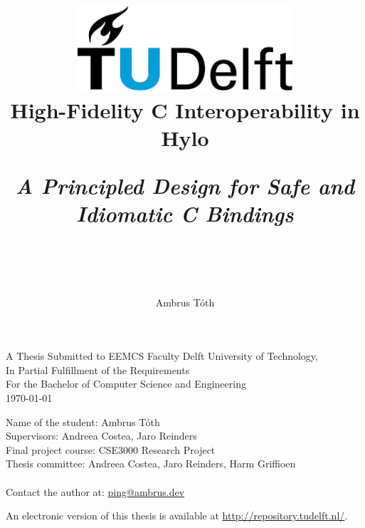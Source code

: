 \title{
    \includegraphics[width=8cm, keepaspectratio]{tudelftlogo.png}\\
    \vspace*{2cm}
    \textbf{
        {High-Fidelity C Interoperability in Hylo}
    }\\
    \vspace*{0.5cm}
    
    \parbox{0.9\linewidth}{
        \centering
        \textit{A Principled Design for Safe and Idiomatic C Bindings}
    }\\

    \vspace*{.3cm}


    \author{
        Ambrus Tóth\\
    }
}


\date{}

\maketitle
\thispagestyle{empty}

\let\clearpagebackup\clearpage
\renewcommand{\clearpage}{ }

\onecolumn

\begin{center}
    A Thesis Submitted to EEMCS Faculty Delft University of Technology,\\
    In Partial Fulfillment of the Requirements\\
    For the Bachelor of Computer Science and Engineering\\
    \today
\end{center}

\vspace*{2cm}

\noindent
{\small
Name of the student: Ambrus Tóth\\
Supervisors: Andreea Costea, Jaro Reinders\\
Final project course: CSE3000 Research Project\\
Thesis committee: Andreea Costea, Jaro Reinders, Harm Griffioen\\ \\
Contact the author at: \href{mailto:ping@ambrus.dev}{ping@ambrus.dev}
}
\vfill

\begin{center}
    An electronic version of this thesis is available at \url{http://repository.tudelft.nl/}.
\end{center}

\twocolumn
\let\clearpage\clearpagebackup  
\clearpage
\setcounter{page}{1}

